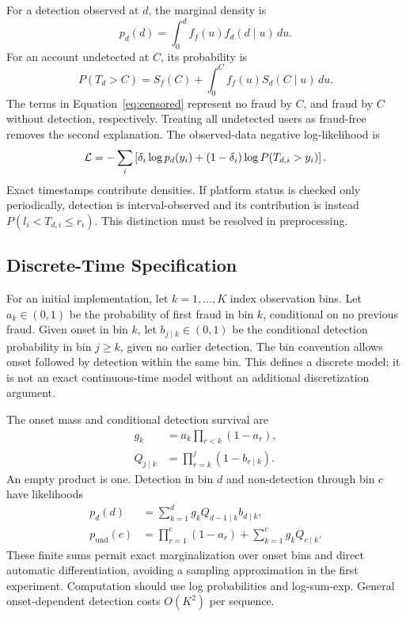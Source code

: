 For a detection observed at $d$, the marginal density is
\begin{equation}
 p_d(d)=\int_0^d f_f(u)f_d(d\mid u)\,du.
 \label{eq:detected}
\end{equation}
For an account undetected at $C$, its probability is
\begin{equation}
 P(T_d>C)=S_f(C)+\int_0^C f_f(u)S_d(C\mid u)\,du.
 \label{eq:censored}
\end{equation}
The terms in Equation~\ref{eq:censored} represent no fraud by $C$, and fraud
by $C$ without detection, respectively. Treating all undetected users as
fraud-free removes the second explanation.
The observed-data negative log-likelihood is
\begin{equation}
 \mathcal{L}=-\sum_i\left[\delta_i\log p_d(y_i)
 +(1-\delta_i)\log P(T_{d,i}>y_i)\right].
 \label{eq:nll}
\end{equation}
Exact timestamps contribute densities. If platform status is checked only
periodically, detection is interval-observed and its contribution is instead
$P(l_i<T_{d,i}\le r_i)$. This distinction must be resolved in preprocessing.

\subsection{Discrete-Time Specification}
For an initial implementation, let $k=1,\ldots,K$ index observation bins.
Let $a_k\in(0,1)$ be the probability of first fraud in bin $k$, conditional on
no previous fraud. Given onset in bin $k$, let $b_{j\mid k}\in(0,1)$ be the
conditional detection probability in bin $j\ge k$, given no earlier detection.
The bin convention allows onset followed by detection within the same bin.
This defines a discrete model; it is not an exact continuous-time model
without an additional discretization argument.

The onset mass and conditional detection survival are
\begin{align}
 g_k&=a_k\prod_{r<k}(1-a_r),\\
 Q_{j\mid k}&=\prod_{r=k}^{j}(1-b_{r\mid k}).
\end{align}
An empty product is one. Detection in bin $d$ and non-detection through bin
$c$ have likelihoods
\begin{align}
 p_d(d)&=\sum_{k=1}^{d}g_k Q_{d-1\mid k}b_{d\mid k},
 \label{eq:discrete-detected}\\
 p_{\mathrm{und}}(c)&=\prod_{r=1}^{c}(1-a_r)
                  +\sum_{k=1}^{c}g_k Q_{c\mid k}.
 \label{eq:discrete-censored}
\end{align}
These finite sums permit exact marginalization over onset bins and direct
automatic differentiation, avoiding a sampling approximation in the first
experiment. Computation should use log probabilities and log-sum-exp.
General onset-dependent detection costs $O(K^2)$ per sequence.


